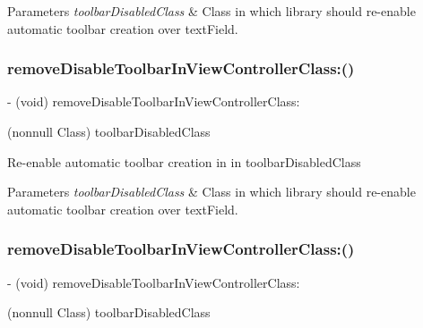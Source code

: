 \begin{DoxyParams}{Parameters}
{\em toolbar\+Disabled\+Class} & Class in which library should re-\/enable automatic toolbar creation over text\+Field. \\
\hline
\end{DoxyParams}
\mbox{\label{interface_i_q_keyboard_manager_a71d38785360ac94f27319b3bf9119d9e}} 
\subsubsection{\texorpdfstring{remove\+Disable\+Toolbar\+In\+View\+Controller\+Class\+:()}{removeDisableToolbarInViewControllerClass:()}\hspace{0.1cm}{\footnotesize\ttfamily [2/3]}}
{\footnotesize\ttfamily -\/ (void) remove\+Disable\+Toolbar\+In\+View\+Controller\+Class\+: \begin{DoxyParamCaption}\item[{(nonnull Class)}]{toolbar\+Disabled\+Class }\end{DoxyParamCaption}}

Re-\/enable automatic toolbar creation in in toolbar\+Disabled\+Class


\begin{DoxyParams}{Parameters}
{\em toolbar\+Disabled\+Class} & Class in which library should re-\/enable automatic toolbar creation over text\+Field. \\
\hline
\end{DoxyParams}
\mbox{\label{interface_i_q_keyboard_manager_a71d38785360ac94f27319b3bf9119d9e}} 
\subsubsection{\texorpdfstring{remove\+Disable\+Toolbar\+In\+View\+Controller\+Class\+:()}{removeDisableToolbarInViewControllerClass:()}\hspace{0.1cm}{\footnotesize\ttfamily [3/3]}}
{\footnotesize\ttfamily -\/ (void) remove\+Disable\+Toolbar\+In\+View\+Controller\+Class\+: \begin{DoxyParamCaption}\item[{(nonnull Class)}]{toolbar\+Disabled\+Class }\end{DoxyParamCaption}}

